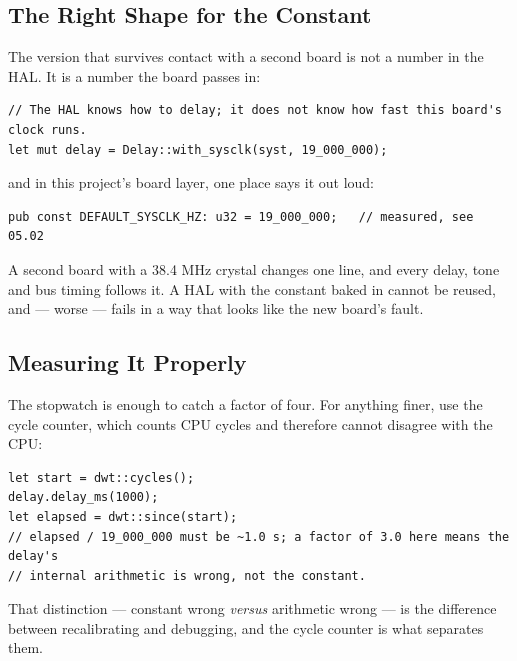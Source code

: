 \subsection{The Right Shape for the Constant}

The version that survives contact with a second board is not a number in the HAL. It is a number the
board passes in:

\begin{verbatim}
// The HAL knows how to delay; it does not know how fast this board's clock runs.
let mut delay = Delay::with_sysclk(syst, 19_000_000);
\end{verbatim}

and in this project's board layer, one place says it out loud:

\begin{verbatim}
pub const DEFAULT_SYSCLK_HZ: u32 = 19_000_000;   // measured, see 05.02
\end{verbatim}

A second board with a 38.4 MHz crystal changes one line, and every delay, tone and bus timing
follows it. A HAL with the constant baked in cannot be reused, and — worse — fails in a way that
looks like the new board's fault.

\subsection{Measuring It Properly}

The stopwatch is enough to catch a factor of four. For anything finer, use the cycle counter, which
counts CPU cycles and therefore cannot disagree with the CPU:

\begin{verbatim}
let start = dwt::cycles();
delay.delay_ms(1000);
let elapsed = dwt::since(start);
// elapsed / 19_000_000 must be ~1.0 s; a factor of 3.0 here means the delay's
// internal arithmetic is wrong, not the constant.
\end{verbatim}

That distinction — constant wrong \emph{versus} arithmetic wrong — is the difference between
recalibrating and debugging, and the cycle counter is what separates them.
